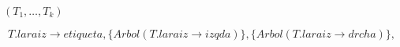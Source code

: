 \documentclass{article}
\begin{document}
$(T_1, \ldots, T_k)$
\pagebreak

\[ T.laraiz \rightarrow etiqueta, \{Arbol(T.laraiz \rightarrow izqda)\}, \{Arbol(T.laraiz \rightarrow drcha)\}, \]
\pagebreak
\end{document}
